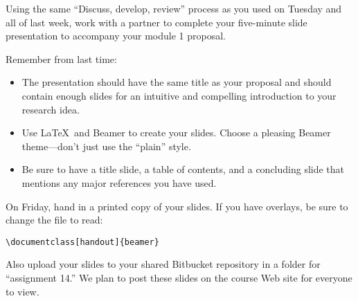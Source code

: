 
\usepackage{ulem}
\usepackage{tikz}
\usepackage[compact]{titlesec}




Using the same ``Discuss, develop, review'' process as you used on Tuesday
and all of last week, work with a partner to
complete your five-minute slide presentation to accompany your module 1 proposal.

Remember from last time:
\begin{itemize}
\item
The presentation should have the same title as your proposal and 
should contain enough slides for an intuitive and compelling introduction 
to your research idea.
\item
Use \LaTeX\ and Beamer to create your slides. Choose a pleasing Beamer
theme---don't just use the ``plain'' style.
\item
Be sure to have a title slide, a table of contents, and a
concluding slide that mentions any major references you have used.
\end{itemize}

On Friday, hand in a printed copy of your slides. If you have overlays,
be sure to change the file to read:
{\color{blue}
\begin{center}
\verb$\documentclass[handout]{beamer}$
\end{center}
}

Also upload your slides to your shared Bitbucket repository in a folder for
``assignment 14.'' We plan to post these slides on the course Web site 
for everyone to view.


